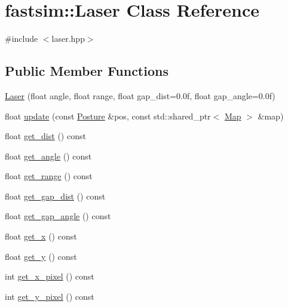 \hypertarget{classfastsim_1_1_laser}{}\section{fastsim\+:\+:Laser Class Reference}
\label{classfastsim_1_1_laser}


{\ttfamily \#include $<$laser.\+hpp$>$}

\subsection*{Public Member Functions}
\begin{DoxyCompactItemize}
\item 
\hyperlink{classfastsim_1_1_laser_a992451fa3ee661953fa5b265b9bf7841}{Laser} (float angle, float range, float gap\+\_\+dist=0.\+0f, float gap\+\_\+angle=0.\+0f)
\item 
float \hyperlink{classfastsim_1_1_laser_aeecf08b19398344d13551d36c5a99873}{update} (const \hyperlink{classfastsim_1_1_posture}{Posture} \&pos, const std\+::shared\+\_\+ptr$<$ \hyperlink{classfastsim_1_1_map}{Map} $>$ \&map)
\item 
float \hyperlink{classfastsim_1_1_laser_aee7bf709a5d80837df279df42ad2c7d1}{get\+\_\+dist} () const 
\item 
float \hyperlink{classfastsim_1_1_laser_a6a6ec656d9b235bff9da167281fb0033}{get\+\_\+angle} () const 
\item 
float \hyperlink{classfastsim_1_1_laser_a87cd6b614dec64ea973ca4e5cb6ac2ba}{get\+\_\+range} () const 
\item 
float \hyperlink{classfastsim_1_1_laser_a146e23d0cd9b93f1a49768632dcded6b}{get\+\_\+gap\+\_\+dist} () const 
\item 
float \hyperlink{classfastsim_1_1_laser_a24466d67ea9a818a3de58c7087cc7158}{get\+\_\+gap\+\_\+angle} () const 
\item 
float \hyperlink{classfastsim_1_1_laser_a0eb83935e42fecdbf874ca5e92c1a402}{get\+\_\+x} () const 
\item 
float \hyperlink{classfastsim_1_1_laser_af035c632d3676973582d2279f4abca5f}{get\+\_\+y} () const 
\item 
int \hyperlink{classfastsim_1_1_laser_aae44a5cc6ee6d5f5f70647a8cf7a6278}{get\+\_\+x\+\_\+pixel} () const 
\item 
int \hyperlink{classfastsim_1_1_laser_a9adbee57db76feb1d96cbcea2f957da4}{get\+\_\+y\+\_\+pixel} () const 
\end{DoxyCompactItemize}
